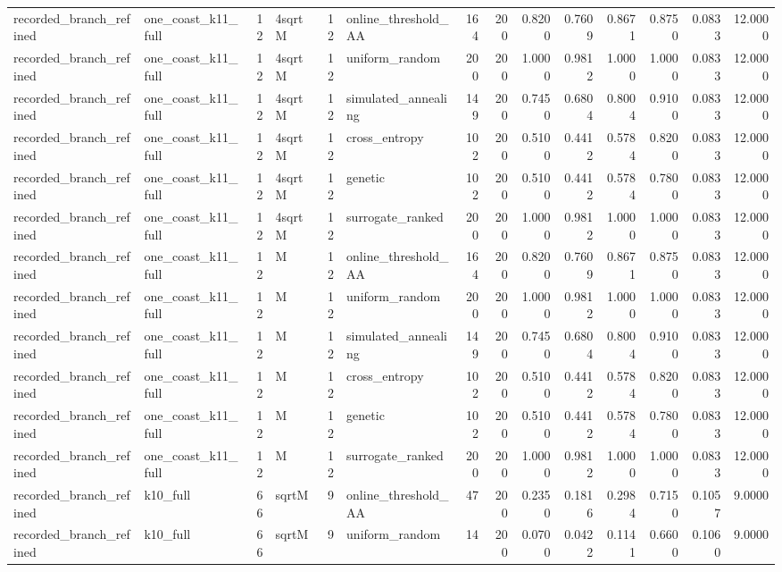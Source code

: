 \begin{tabular}{llrlrlrrrrrrrr}
recorded\_branch\_refined & one\_coast\_k11\_full & 12 & 4sqrtM & 12 & online\_threshold\_AA & 164 & 200 & 0.8200 & 0.7609 & 0.8671 & 0.8750 & 0.0833 & 12.0000 \\
recorded\_branch\_refined & one\_coast\_k11\_full & 12 & 4sqrtM & 12 & uniform\_random & 200 & 200 & 1.0000 & 0.9812 & 1.0000 & 1.0000 & 0.0833 & 12.0000 \\
recorded\_branch\_refined & one\_coast\_k11\_full & 12 & 4sqrtM & 12 & simulated\_annealing & 149 & 200 & 0.7450 & 0.6804 & 0.8004 & 0.9100 & 0.0833 & 12.0000 \\
recorded\_branch\_refined & one\_coast\_k11\_full & 12 & 4sqrtM & 12 & cross\_entropy & 102 & 200 & 0.5100 & 0.4412 & 0.5784 & 0.8200 & 0.0833 & 12.0000 \\
recorded\_branch\_refined & one\_coast\_k11\_full & 12 & 4sqrtM & 12 & genetic & 102 & 200 & 0.5100 & 0.4412 & 0.5784 & 0.7800 & 0.0833 & 12.0000 \\
recorded\_branch\_refined & one\_coast\_k11\_full & 12 & 4sqrtM & 12 & surrogate\_ranked & 200 & 200 & 1.0000 & 0.9812 & 1.0000 & 1.0000 & 0.0833 & 12.0000 \\
recorded\_branch\_refined & one\_coast\_k11\_full & 12 & M & 12 & online\_threshold\_AA & 164 & 200 & 0.8200 & 0.7609 & 0.8671 & 0.8750 & 0.0833 & 12.0000 \\
recorded\_branch\_refined & one\_coast\_k11\_full & 12 & M & 12 & uniform\_random & 200 & 200 & 1.0000 & 0.9812 & 1.0000 & 1.0000 & 0.0833 & 12.0000 \\
recorded\_branch\_refined & one\_coast\_k11\_full & 12 & M & 12 & simulated\_annealing & 149 & 200 & 0.7450 & 0.6804 & 0.8004 & 0.9100 & 0.0833 & 12.0000 \\
recorded\_branch\_refined & one\_coast\_k11\_full & 12 & M & 12 & cross\_entropy & 102 & 200 & 0.5100 & 0.4412 & 0.5784 & 0.8200 & 0.0833 & 12.0000 \\
recorded\_branch\_refined & one\_coast\_k11\_full & 12 & M & 12 & genetic & 102 & 200 & 0.5100 & 0.4412 & 0.5784 & 0.7800 & 0.0833 & 12.0000 \\
recorded\_branch\_refined & one\_coast\_k11\_full & 12 & M & 12 & surrogate\_ranked & 200 & 200 & 1.0000 & 0.9812 & 1.0000 & 1.0000 & 0.0833 & 12.0000 \\
recorded\_branch\_refined & k10\_full & 66 & sqrtM & 9 & online\_threshold\_AA & 47 & 200 & 0.2350 & 0.1816 & 0.2984 & 0.7150 & 0.1057 & 9.0000 \\
recorded\_branch\_refined & k10\_full & 66 & sqrtM & 9 & uniform\_random & 14 & 200 & 0.0700 & 0.0422 & 0.1141 & 0.6600 & 0.1060 & 9.0000 \\

\end{tabular}
